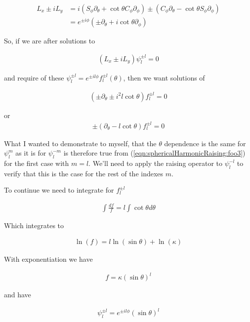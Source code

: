 \begin{align*}
L_x \pm iL_y
&= 
i (S_\phi \partial_\theta + \cot\theta C_\phi \partial_\phi)
\pm (C_\phi \partial_\theta - \cot\theta S_\phi \partial_\phi) \\
&= e^{\pm i\phi} (\pm \partial_\theta + i \cot\theta \partial_\phi )
\end{align*}

So, if we are after solutions to 

\begin{align}\label{eqn:sphericalHarmonicRaising:foo1}
(L_x \pm iL_y) \psi_l^{\pm l} = 0
\end{align}

and require of these $\psi_l^{\pm l} = e^{\pm i l \phi} f_l^{\pm l}(\theta)$, then we want solutions of

\begin{align}\label{eqn:sphericalHarmonicRaising:foo2}
(\pm \partial_\theta \pm i^2 l \cot\theta ) f_l^{\pm l} = 0
\end{align}

or
\begin{align}\label{eqn:sphericalHarmonicRaising:foo3}
\pm (\partial_\theta - l \cot\theta ) f_l^{\pm l} = 0
\end{align}

What I wanted to demonstrate to myself, that the $\theta$ dependence is the same for $\psi_l^m$ as it is for $\psi_l^{-m}$ is therefore true from (\ref{eqn:sphericalHarmonicRaising:foo3}) for the first case with $m=l$.  We'll need to apply the raising operator to $\psi_l^{-l}$ to verify that this is the case for the rest of the indexes $m$.

To continue we need to integrate for $f_l^{\pm l}$

\begin{align*}
\int \frac{d f}{f} = l \int \cot\theta d\theta
\end{align*}

Which integrates to

\begin{align*}
\ln(f) = l \ln(\sin\theta) + \ln(\kappa)
\end{align*}

With exponentiation we have

\begin{align*}
f = \kappa (\sin\theta)^l
\end{align*}

and have

\begin{align}\label{eqn:sphericalHarmonicRaising:foo4}
\psi_l^{\pm l} = e^{\pm i l \phi} (\sin\theta)^l
\end{align}

